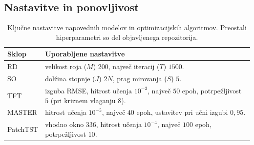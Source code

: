 \documentclass[9pt]{style/friteza}
\begin{document}
\clearpage %
\begin{appendices}
\titlespacing*{\subsection}{0pc}{1.5ex}{1ex}
\subsection{Nastavitve in ponovljivost}\label{sec:repro}

\begin{table}[H]
\centering
\scriptsize
\renewcommand{\arraystretch}{1.1}
\caption{Ključne nastavitve napovednih modelov in optimizacijskih
algoritmov. Preostali hiperparametri so del objavljenega repozitorija.}
\label{tab:hparams}
\begin{tabular*}{\linewidth}{@{\extracolsep{\fill}}ll}
\hline
Sklop & Uporabljene nastavitve \\
\hline
RD & velikost roja ($M$) $200$, največ iteracij ($T$) $1500$. \\
SO & dolžina stopnje ($J$) $2N$, prag mirovanja ($S$) $5$. \\
TFT & izguba RMSE, hitrost učenja $10^{-3}$, največ $50$ epoh, potrpežljivost $5$ (pri kriznem vlaganju $8$). \\
MASTER & hitrost učenja $10^{-5}$, največ $40$ epoh, ustavitev pri učni izgubi $0{,}95$. \\
PatchTST & vhodno okno $336$, hitrost učenja $10^{-4}$, največ $100$ epoh, potrpežljivost $10$. \\
\hline
\end{tabular*}
\end{table}


\end{appendices}
\end{document}
